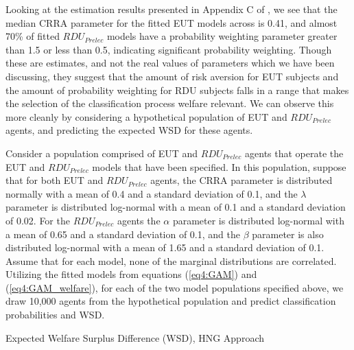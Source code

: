 \documentclass[../main.tex]{subfiles}
\begin{document}
Looking at the estimation results presented in Appendix C of \textcite{Harrison2016}, we see that the median CRRA parameter for the fitted EUT models across is 0.41, and almost 70\% of fitted $\mathit{RDU_{Prelec}}$ models have a probability weighting parameter greater than 1.5 or less than 0.5, indicating significant probability weighting.
Though these are estimates, and not the real values of parameters which we have been discussing, they suggest that the amount of risk aversion for EUT subjects and the amount of probability weighting for RDU subjects falls in a range that makes the selection of the classification process welfare relevant.
We can observe this more cleanly by considering a hypothetical population of EUT and $\mathit{RDU_{Prelec}}$ agents, and predicting the expected WSD for these agents.

Consider a population comprised of EUT and $\mathit{RDU_{Prelec}}$ agents that operate the EUT and $\mathit{RDU_{Prelec}}$ models that have been specified.
In this population, suppose that for both EUT and $\mathit{RDU_{Prelec}}$ agents, the CRRA parameter is distributed normally with a mean of 0.4 and a standard deviation of 0.1, and the $\lambda$ parameter is distributed log-normal with a mean of 0.1 and a standard deviation of 0.02.
For the $\mathit{RDU_{Prelec}}$ agents the $\alpha$ parameter is distributed log-normal with a mean of 0.65 and a standard deviation of 0.1, and the $\beta$ parameter is also distributed log-normal with a mean of 1.65 and a standard deviation of 0.1.
Assume that for each model, none of the marginal distributions are correlated.
Utilizing the fitted models from equations (\ref{eq4:GAM}) and (\ref{eq4:GAM_welfare}), for each of the two model populations specified above, we draw 10,000 agents from the hypothetical population and predict classification probabilities and WSD.

\begin{table}[h!] %
	\centering
	\caption{Expected Welfare Surplus Difference (WSD), HNG Approach}
	\label{tb:HNG1_win05_pop}
	\begin{adjustbox}{}
	\end{adjustbox}
\end{table}
\end{document}
